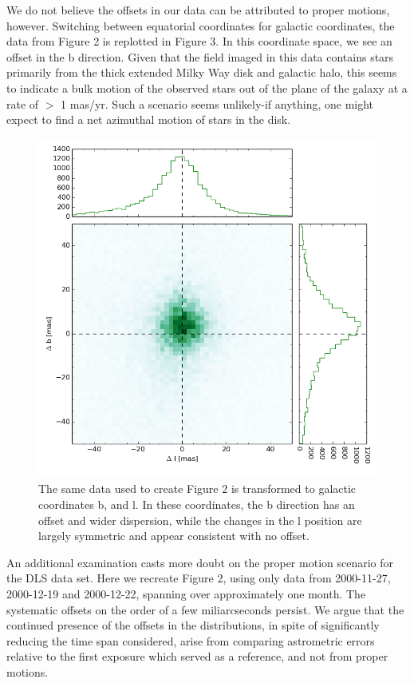 \documentclass[DM,toc]{lsstdoc}
\begin{document}
We do not believe the offsets in our data can be attributed to proper motions, however. Switching between equatorial coordinates for galactic coordinates, the data from Figure 2 is replotted in Figure 3. In this coordinate space, we see an offset in the b direction. Given that the field imaged in this data contains stars primarily from the thick extended Milky Way disk and galactic halo, this seems to indicate a bulk motion of the observed stars out of the plane of the galaxy at a rate of $>$ 1 mas/yr. Such a scenario seems unlikely-if anything, one might expect to find a net azimuthal motion of stars in the disk.

\begin{figure}[h!]
	\includegraphics[width=.9\textwidth]{tech_memo_b_l.png}
    \caption{The same data used to create Figure 2 is transformed to galactic coordinates b, and l. In these coordinates, the b direction has an offset and wider dispersion, while the changes in the l position are largely symmetric and appear consistent with no offset. }
\end{figure}

An additional examination casts more doubt on the proper motion scenario for the DLS data set. Here we recreate Figure 2, using only data from 2000-11-27, 2000-12-19 and 2000-12-22, spanning over approximately one month. The systematic offsets on the order of a few miliarcseconds persist. We argue that the continued presence of the offsets in the distributions, in spite of significantly reducing the time span considered, arise from comparing astrometric errors relative to the first exposure which served as a reference, and not from proper motions.
\end{document}
